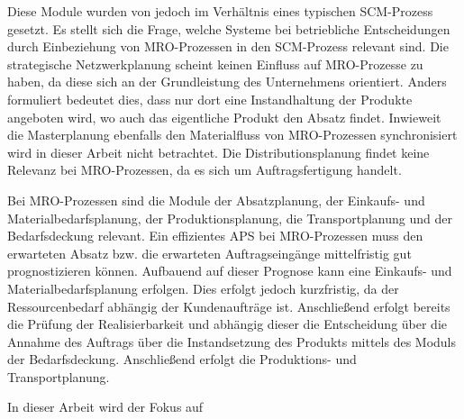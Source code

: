 Diese Module wurden von \cite{meyr2015structure} jedoch im Verhältnis eines typischen SCM-Prozess gesetzt. Es stellt sich die Frage, welche Systeme bei betriebliche Entscheidungen durch Einbeziehung von MRO-Prozessen in den SCM-Prozess relevant sind. Die strategische Netzwerkplanung scheint keinen Einfluss auf MRO-Prozesse zu haben, da diese sich an der Grundleistung des Unternehmens orientiert. Anders formuliert bedeutet dies, dass nur dort eine Instandhaltung der Produkte angeboten wird, wo auch das eigentliche Produkt den Absatz findet. Inwieweit die Masterplanung ebenfalls den Materialfluss von MRO-Prozessen synchronisiert wird in dieser Arbeit nicht betrachtet. Die Distributionsplanung findet keine Relevanz bei MRO-Prozessen, da es sich um Auftragsfertigung handelt.

Bei MRO-Prozessen sind die Module der Absatzplanung, der Einkaufs- und Materialbedarfsplanung, der Produktionsplanung, die Transportplanung und der Bedarfsdeckung relevant. Ein effizientes APS bei MRO-Prozessen muss den erwarteten Absatz bzw. die erwarteten Auftragseingänge mittelfristig gut prognostizieren können. Aufbauend auf dieser Prognose kann eine Einkaufs- und Materialbedarfsplanung erfolgen. Dies erfolgt jedoch kurzfristig, da der Ressourcenbedarf abhängig der Kundenaufträge ist. Anschließend erfolgt bereits die Prüfung der Realisierbarkeit und abhängig dieser die Entscheidung über die Annahme des Auftrags über die Instandsetzung des Produkts mittels des Moduls der Bedarfsdeckung. Anschließend erfolgt die Produktions- und Transportplanung.

In dieser Arbeit wird der Fokus auf 







